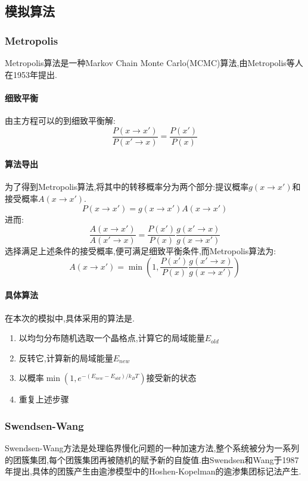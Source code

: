 \documentclass[12pt]{article} %
\begin{document}
\subsection{模拟算法}
\subsubsection{Metropolis}
Metropolis算法\cite{Metropolis_wiki}是一种Markov Chain Monte Carlo(MCMC)算法,由Metropolis等人在1953年提出\cite{Metropolis:1953vj}.
\paragraph{细致平衡}
由主方程\cite{Master_equ}可以的到细致平衡解:
\begin{equation}
\label{equ: Detaled_balance}
\frac{P(x\rightarrow x')}{P(x'\rightarrow x)} = \frac{P(x')}{P(x)}
\end{equation}
\paragraph{算法导出}
为了得到Metropolis算法,将其中的转移概率分为两个部分:提议概率$g(x\rightarrow x')$和接受概率$A(x\rightarrow x')$.
$$P(x\rightarrow x') = g(x\rightarrow x')A(x\rightarrow x')$$
进而:
$$
\frac{A(x\rightarrow x')}{A(x'\rightarrow x)} = \frac{P(x')}{P(x)}\frac{g(x'\rightarrow x)}{g(x\rightarrow x')}
$$
选择满足上述条件的接受概率,便可满足细致平衡条件,而Metropolis算法为:
\begin{equation}
\label{equ: Metropolis}
A(x\rightarrow x') = \min\left(1,\frac{P(x')}{P(x)}\frac{g(x'\rightarrow x)}{g(x\rightarrow x')}\right)
\end{equation}

\paragraph{具体算法}
在本次的模拟中,具体采用的算法是.
\begin{enumerate}
    \item 以均匀分布随机选取一个晶格点,计算它的局域能量$E_{old}$
    \item 反转它,计算新的局域能量$E_{new}$
    \item 以概率$\min(1,e^{-(E_{new}-E_{old})/k_{B}T})$接受新的状态
    \item 重复上述步骤
\end{enumerate}

\subsubsection{Swendsen-Wang}
Swendsen-Wang方法是处理临界慢化问题的一种加速方法,整个系统被分为一系列的团簇集团,每个团簇集团再被随机的赋予新的自旋值.由Swendsen和Wang于1987年提出\cite{Swendsen:1987eq},具体的团簇产生由逾渗模型中的Hoshen-Kopelman的逾渗集团标记法\cite{Hoshen:1976vg}产生.
\end{document}
